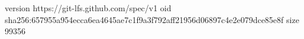 version https://git-lfs.github.com/spec/v1
oid sha256:657955a954ecca6ea4645ae7c1f9a3f792aff21956d06897c4e2e079dce85e8f
size 99356
